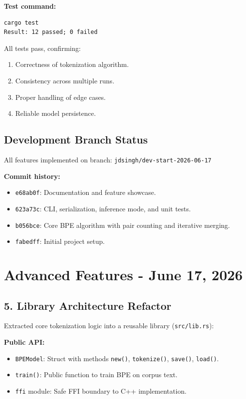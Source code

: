 \documentclass[11pt]{article}
\begin{document}
\textbf{Test command:}
\begin{verbatim}
cargo test
Result: 12 passed; 0 failed
\end{verbatim}

All tests pass, confirming:
\begin{enumerate}[leftmargin=1.5em]
  \item Correctness of tokenization algorithm.
  \item Consistency across multiple runs.
  \item Proper handling of edge cases.
  \item Reliable model persistence.
\end{enumerate}

\subsection{Development Branch Status}
All features implemented on branch: \texttt{jdsingh/dev-start-2026-06-17}

\textbf{Commit history:}
\begin{itemize}[leftmargin=1.2em]
  \item \texttt{e68ab0f}: Documentation and feature showcase.
  \item \texttt{623a73c}: CLI, serialization, inference mode, and unit tests.
  \item \texttt{b056bce}: Core BPE algorithm with pair counting and iterative merging.
  \item \texttt{fabedff}: Initial project setup.
\end{itemize}

\section{Advanced Features - June 17, 2026}

\subsection{5. Library Architecture Refactor}
Extracted core tokenization logic into a reusable library (\texttt{src/lib.rs}):

\textbf{Public API:}
\begin{itemize}[leftmargin=1.2em]
  \item \texttt{BPEModel}: Struct with methods \texttt{new()}, \texttt{tokenize()}, \texttt{save()}, \texttt{load()}.
  \item \texttt{train()}: Public function to train BPE on corpus text.
  \item \texttt{ffi} module: Safe FFI boundary to C++ implementation.
\end{itemize}
\end{document}
